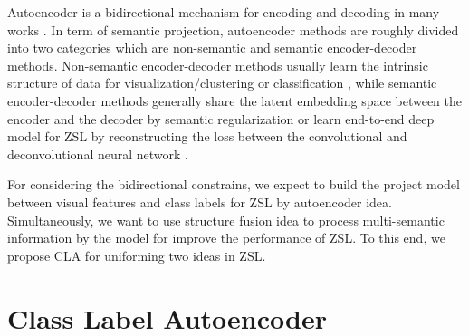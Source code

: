 \documentclass[review]{elsarticle}
\begin{document}
Autoencoder is a bidirectional mechanism for encoding and decoding in many works \cite{Baldi1989Hornik} \cite{Rifai2011Contractive} \cite{Xie2015Unsupervised} \cite{Chen2012Marginalized} \cite{Badrinarayanan2017SegNet}\cite{Yan2015Attribute2Image} \cite{Reed2016Generative} \cite{Kodirov2017}. In term of semantic projection, autoencoder methods are roughly divided into two categories which are non-semantic and semantic encoder-decoder methods. Non-semantic encoder-decoder methods usually learn the intrinsic structure of data for visualization/clustering \cite{Xie2015Unsupervised} or classification \cite{Chen2012Marginalized}, while semantic encoder-decoder methods generally share the latent embedding space between the encoder and the decoder by semantic regularization \cite{Yan2015Attribute2Image} \cite{Reed2016Generative} or learn end-to-end deep model for ZSL by reconstructing the loss between the convolutional and deconvolutional neural network \cite{Kodirov2017}.

For considering the bidirectional constrains, we expect to build the project model between visual features and class labels for ZSL by autoencoder idea. Simultaneously, we want to use structure fusion idea to process multi-semantic information by the model for improve the performance of ZSL. To this end, we propose CLA for uniforming two ideas in ZSL.
\section{Class Label Autoencoder}
\end{document}
